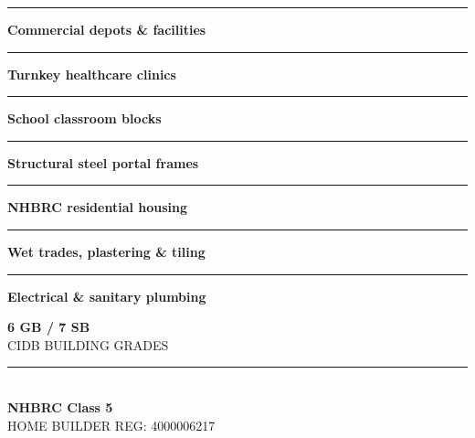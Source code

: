 \documentclass[a4paper,11pt]{article}
\begin{document}
\begin{minipage}[t]{0.34\textwidth}
    \vspace{0pt}
    \begin{tcolorbox}[
        enhanced, colback=mhoffwhite, colframe=mhnavy, boxrule=1pt, arc=4pt,
        title={\bfseries\color{white}\faBuilding\ Building Scope of Work},
        colbacktitle=mhnavy, left=7pt, right=7pt, top=6pt, bottom=6pt,
        drop shadow=black!6
    ]
        \fontsize{8.1pt}{11.6pt}\selectfont
        \textcolor{mhnavy}{\rule{4pt}{4pt}}\hspace{4pt}\textbf{Commercial depots \& facilities}\\
        \textcolor{mhnavy}{\rule{4pt}{4pt}}\hspace{4pt}\textbf{Turnkey healthcare clinics}\\
        \textcolor{mhnavy}{\rule{4pt}{4pt}}\hspace{4pt}\textbf{School classroom blocks}\\
        \textcolor{mhnavy}{\rule{4pt}{4pt}}\hspace{4pt}\textbf{Structural steel portal frames}\\
        \textcolor{mhnavy}{\rule{4pt}{4pt}}\hspace{4pt}\textbf{NHBRC residential housing}\\
        \textcolor{mhnavy}{\rule{4pt}{4pt}}\hspace{4pt}\textbf{Wet trades, plastering \& tiling}\\
        \textcolor{mhnavy}{\rule{4pt}{4pt}}\hspace{4pt}\textbf{Electrical \& sanitary plumbing}
    \end{tcolorbox}

    \vspace{0.20cm}

    \begin{tcolorbox}[
        enhanced, colback=white, colframe=mhlightgray, boxrule=0.8pt, arc=4pt,
        left=6pt, right=6pt, top=6pt, bottom=6pt, halign=center,
        drop shadow=black!4
    ]
        {\fontsize{18pt}{20pt}\selectfont\bfseries\color{mhblue}6 GB / 7 SB}\\[1pt]
        {\fontsize{7.4pt}{9pt}\selectfont\color{mhtextmuted}\MakeUppercase{CIDB Building Grades}}\\[4pt]
        \textcolor{mhlightgray}{\rule{3.2cm}{0.6pt}}\\[4pt]
        {\fontsize{13pt}{15pt}\selectfont\bfseries\color{mhnavy}NHBRC Class 5}\\[1pt]
        {\fontsize{7.2pt}{9pt}\selectfont\color{mhtextmuted}\MakeUppercase{Home Builder Reg: 4000006217}}
    \end{tcolorbox}
\end{minipage}
\end{document}
